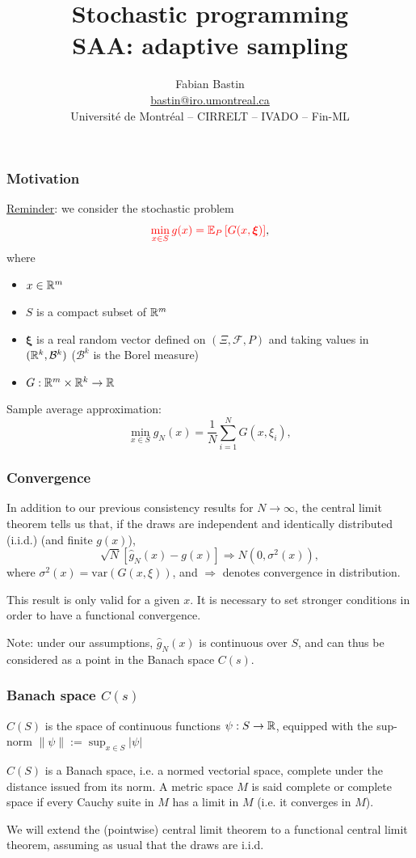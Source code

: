 \documentclass{beamer}
\title[Adaptive methods]{Stochastic programming\\SAA: adaptive sampling}
\author[Fabian Bastin]{Fabian Bastin \\ \url{bastin@iro.umontreal.ca} \\ Université de Montréal -- CIRRELT -- IVADO -- Fin-ML}
\date{}
\def\bxi{\boldsymbol\xi}
\begin{document}
\frame{\titlepage}

\begin{frame}
\frametitle{Motivation}

\underline{Reminder}: we consider the stochastic problem
\[
\textcolor{red}{\min_{x \in S} g(x) = \EE_P \left[ G(x, \bxi) \right]},
\]
where
\begin{itemize}
	\item
	$x \in \mathbb{R}^m$
	\item
	$S$ is a compact subset of $\mathbb{R}^m$
	\item
	$\bxi$ is a real random vector defined on $( \Xi, \mathcal{F}, P )$ and taking values in $( \mathbb{R}^k, \mathcal{B}^k )$ ($\mathcal{B}^k$ is the Borel measure)
	\item
	$G: \mathbb{R}^m \times \mathbb{R}^k \rightarrow \mathbb{R}$
\end{itemize}

Sample average approximation:
\[
\min_{x \in S} \hat{g}_N(x) = \frac{1}{N} \sum_{i = 1}^N G (x, \xi_i),
\]

\end{frame}

\begin{frame}
\frametitle{Convergence}

In addition to our previous consistency results for $N \rightarrow \infty$, the central limit theorem tells us that, if the draws are independent and identically distributed (i.i.d.) (and finite $g(x)$),
\[
\sqrt{N} [ \hat{g}_N(x) - g(x) ] \Rightarrow N(0, \sigma^2(x)),
\]
where $\sigma^2(x) = \mbox{var}(G(x,\xi))$, and $\Rightarrow$ denotes convergence in distribution.

\mbox{}

This result is only valid for a given $x$.
It is necessary to set stronger conditions in order to have a functional convergence.

\mbox{}

Note: under our assumptions, $\hat{g}_N(x)$ is continuous over $S$, and can thus be considered as a point in the Banach space $C(s)$.

\end{frame}

\begin{frame}
\frametitle{Banach space $C(s)$}

$C(S)$ is the space of continuous functions $\psi: S \rightarrow \mathbb{R}$,
equipped with the sup-norm $\| \psi \| := \sup_{x \in S}| \psi |$

\mbox{}

$C(S)$ is a Banach space, i.e. a normed vectorial space, complete under the distance issued from its norm.
A metric space $M$ is said complete or complete space if every Cauchy suite in $M$ has a limit in $M$ (i.e. it converges in $M$).

\mbox{}

We will extend the (pointwise) central limit theorem to a functional central limit theorem, assuming as usual that the draws are i.i.d.

\end{frame}
\end{document}
